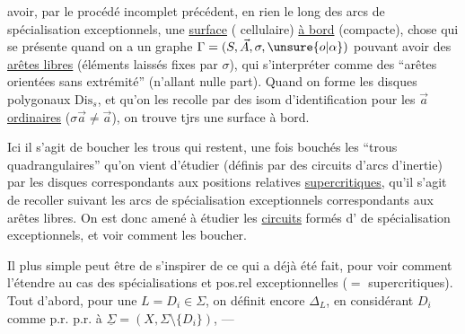 avoir, par le procédé incomplet précédent, en  rien le long des arcs de spécialisation exceptionnels, une \uline{surface} ( cellulaire) \uline{à bord} (compacte), chose qui se présente quand on a un graphe $\Gamma=(S,\vec A,\sigma,\unsure{o|\alpha})$ pouvant avoir des  \uline{arêtes libres} (éléments  laissés fixes par $\sigma$), qui  s'interpréter comme des ``arêtes orientées sans extrémité'' (n'allant nulle part). Quand on forme les disques polygonaux $\mathrm{Dis}_s$, et qu'on les recolle par des isom d'identification pour les $\vec a$ \uline{ordinaires} ($\sigma\vec a\ne\vec a$), on trouve tjrs une surface à bord.

Ici il s'agit de boucher les trous qui restent,  une fois bouchés les ``trous quadrangulaires'' qu'on vient d'étudier (définis par des circuits d'arcs d'inertie) par les disques correspondants aux positions relatives \uline{supercritiques}, qu'il s'agit de recoller  suivant les arcs de spécialisation exceptionnels correspondants aux arêtes libres. On est donc amené à étudier les \uline{circuits} formés d' de spécialisation exceptionnels, et voir comment les boucher.

 Il  plus simple peut être de s'inspirer de ce qui a déjà été fait, pour voir comment l'étendre au cas des spécialisations et pos.rel exceptionnelles ($=$ supercritiques). Tout d'abord, pour une  $L=D_i\in\Sigma$, on définit encore $\Delta_L$, en considérant $D_i$ comme p.r. p.r. à $\underline\Sigma=(X,\Sigma\setminus\{D_i\})$, ---
